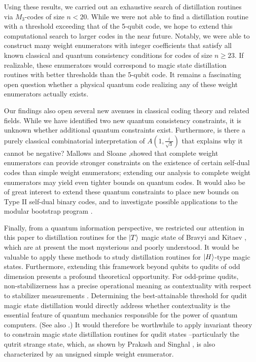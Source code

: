 \documentclass[11pt]{article}
\def\ket#1{\mathinner{|{#1}\rangle}}
\begin{document}
Using these results, we carried out an exhaustive search of distillation routines via $M_3$-codes of size $n<20$. While we were not able to find a distillation routine with a threshold exceeding that of the 5-qubit code, we hope to extend this computational search to larger codes in the near future. Notably, we were able to construct many weight enumerators with integer coefficients that satisfy all known classical and quantum consistency conditions for codes of size $n\geq23$. If realizable, these enumerators would correspond to magic state distillation routines with better thresholds than the 5-qubit code. It remains a fascinating open question whether a physical quantum code realizing any of these weight enumerators actually exists.

Our findings also open several new avenues in classical coding theory and related fields. While we have identified two new quantum consistency constraints, it is unknown whether additional quantum constraints exist. Furthermore, is there a purely classical combinatorial interpretation of $A(1,\frac{i}{\sqrt{3}})$ that explains why it cannot be negative? Mallows and Sloane  \cite{mallows1981weight},showed that complete weight enumerators can provide stronger constraints on the existence of certain self-dual codes than simple weight enumerators; extending our analysis to complete weight enumerators may yield even tighter bounds on quantum codes. It would also be of great interest to extend these quantum constraints to place new bounds on Type II self-dual binary codes, and to investigate possible applications to the modular bootstrap program \cite{dymarsky2021solutions, dymarsky2021quantum, dymarsky2023fake, angelinos2022optimal, alam2023narain}.

Finally, from a quantum information perspective, we restricted our attention in this paper to distillation routines for the $\ket{T}$ magic state of Bravyi and Kitaev \cite{MSD}, which are at present the most mysterious and poorly understood. It would be valuable to apply these methods to study distillation routines for $\ket{H}$-type magic states. Furthermore, extending this framework beyond qubits to qudits of odd dimension presents a profound theoretical opportunity. For odd-prime qudits, non-stabilizerness has a precise operational meaning as contextuality with respect to stabilizer measurements \cite{nature}. Determining the best-attainable threshold for qudit magic state distillation would directly address whether contextuality is the essential feature of quantum mechanics responsible for the power of quantum computers. (See also \cite{PhysRevA.95.052334,PhysRevLett.122.140405, DPS2, Delfosse_2017}.) It would therefore be worthwhile to apply invariant theory to constrain magic state distillation routines for qudit states --particularly the qutrit strange state, which, as shown by Prakash and Singhal  \cite{prakash2024search}, is also characterized by an unsigned simple weight enumerator. 
\end{document}
